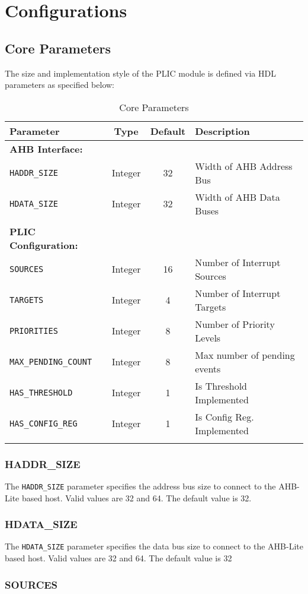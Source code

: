 \section{Configurations}

\subsection{Core Parameters}

The size and implementation style of the PLIC module is defined via HDL
parameters as specified below:

\begin{longtable}[]{@{}lccl@{}}
\toprule
\textbf{Parameter} & \textbf{Type} & \textbf{Default} & \textbf{Description}\tabularnewline
\midrule
\endhead
\textbf{AHB Interface:} & & &\tabularnewline
\texttt{HADDR\_SIZE} & Integer & 32 & Width of AHB Address Bus\tabularnewline
\texttt{HDATA\_SIZE} & Integer & 32 & Width of AHB Data Buses\tabularnewline
& & &\tabularnewline
\textbf{PLIC Configuration:} & & &\tabularnewline
\texttt{SOURCES} & Integer & 16 & Number of Interrupt Sources\tabularnewline
\texttt{TARGETS} & Integer & 4 & Number of Interrupt Targets\tabularnewline
\texttt{PRIORITIES} & Integer & 8 & Number of Priority Levels\tabularnewline
\texttt{MAX\_PENDING\_COUNT} & Integer & 8 & Max number of pending events\tabularnewline
\texttt{HAS\_THRESHOLD} & Integer & 1 & Is Threshold Implemented\tabularnewline
\texttt{HAS\_CONFIG\_REG} & Integer & 1 & Is Config Reg. Implemented\tabularnewline
\bottomrule
\caption{Core Parameters}
\label{tab:CoreParams}
\end{longtable}


\subsubsection{HADDR\_SIZE}

The \texttt{HADDR\_SIZE} parameter specifies the address bus size to
connect to the AHB-Lite based host. Valid values are 32 and 64. The
default value is 32.

\subsubsection{HDATA\_SIZE}

The \texttt{HDATA\_SIZE} parameter specifies the data bus size to
connect to the AHB-Lite based host. Valid values are 32 and 64. The
default value is 32

\hypertarget{SOURCES}{\subsubsection{SOURCES}\label{sec:SOURCES}}

